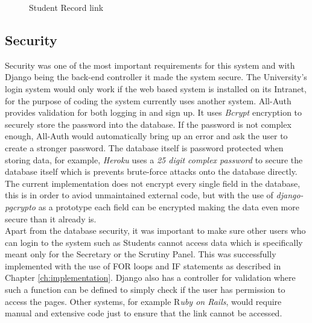 \documentclass[../main.tex]{subfiles}
\begin{document}
\begin{figure}[H]
        \caption{\label{fig:studlink} Student Record link}
      \end{figure}
      
\subsection*{Security}  
Security was one of the most important requirements for this system and with Django being the back-end controller it made the system secure. The University's login system would only work if the web based system is installed on its Intranet, for the purpose of coding the system currently uses another system. All-Auth\cite{allauth} provides validation for both logging in and sign up. It uses \textit{Bcrypt}\cite{bcrypt} encryption to securely store the password into the database. If the password is not complex enough, All-Auth would automatically bring up an error and ask the user to create a stronger password. The database itself is password protected when storing data, for example, \textit{Heroku} uses a \textit{25 digit complex password} to secure the database itself which is prevents brute-force attacks onto the database directly. The current implementation does not encrypt every single field in the database, this is in order to aviod unmaintained external code, but with the use of \textit{django-pgcrypto}\cite{dbencrypt} as a prototype each field can be encrypted making the data even more secure than it already is. \\[4mm]

Apart from the database security, it was important to make sure other users who can login to the system such as Students cannot access data which is specifically meant only for the Secretary or the Scrutiny Panel. This was successfully implemented with the use of FOR loops and IF statements as described in Chapter \ref{ch:implementation}. Django also has a controller for validation where such a function can be defined to simply check if the user has permission to access the pages. Other systems, for example R\textit{uby on Rails}, would require manual and extensive code just to ensure that the link cannot be accessed. \\[4mm]
\end{document}
